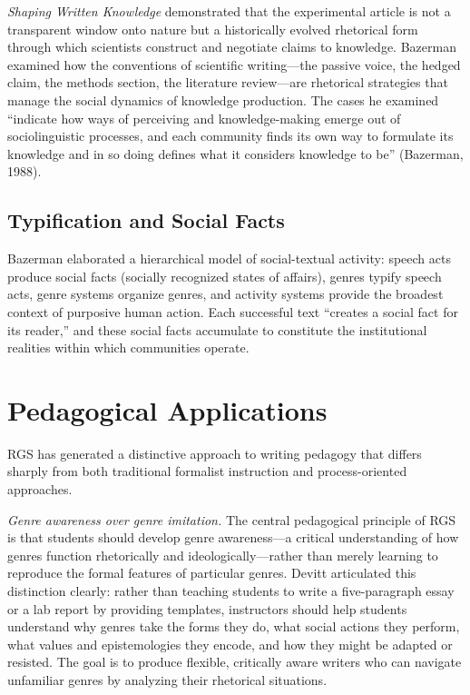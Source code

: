 \documentclass[12pt]{article}
\begin{document}
\textit{Shaping Written Knowledge} demonstrated that the experimental article is not a transparent window onto nature but a historically evolved rhetorical form through which scientists construct and negotiate claims to knowledge. Bazerman examined how the conventions of scientific writing---the passive voice, the hedged claim, the methods section, the literature review---are rhetorical strategies that manage the social dynamics of knowledge production. The cases he examined ``indicate how ways of perceiving and knowledge-making emerge out of sociolinguistic processes, and each community finds its own way to formulate its knowledge and in so doing defines what it considers knowledge to be'' (Bazerman, 1988).

\subsection{Typification and Social Facts}

Bazerman elaborated a hierarchical model of social-textual activity: speech acts produce social facts (socially recognized states of affairs), genres typify speech acts, genre systems organize genres, and activity systems provide the broadest context of purposive human action. Each successful text ``creates a social fact for its reader,'' and these social facts accumulate to constitute the institutional realities within which communities operate.

\section{Pedagogical Applications}

RGS has generated a distinctive approach to writing pedagogy that differs sharply from both traditional formalist instruction and process-oriented approaches.

\textit{Genre awareness over genre imitation.} The central pedagogical principle of RGS is that students should develop genre awareness---a critical understanding of how genres function rhetorically and ideologically---rather than merely learning to reproduce the formal features of particular genres. Devitt articulated this distinction clearly: rather than teaching students to write a five-paragraph essay or a lab report by providing templates, instructors should help students understand why genres take the forms they do, what social actions they perform, what values and epistemologies they encode, and how they might be adapted or resisted. The goal is to produce flexible, critically aware writers who can navigate unfamiliar genres by analyzing their rhetorical situations.
\end{document}
